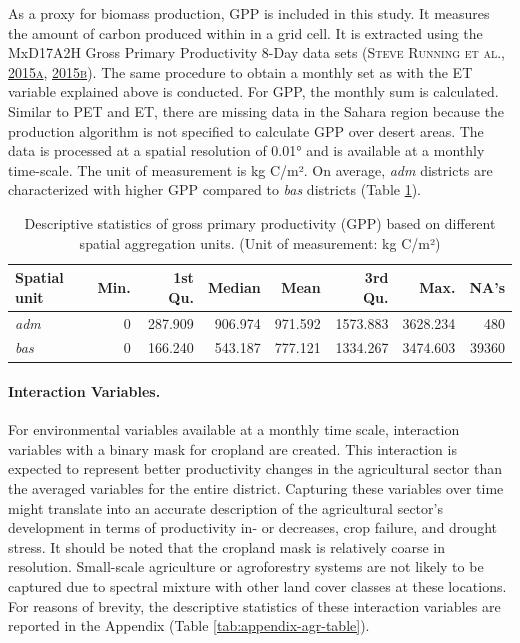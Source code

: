 \documentclass[a4paper,11pt]{article}
\begin{document}
As a proxy for biomass production, GPP is included in this study. It measures the amount
of carbon produced within in a grid cell. It is extracted using the MxD17A2H
Gross Primary Productivity 8-Day data sets \textsc{(\textnormal{\textsc{Steve Running} \textsc{et al.}}, \textnormal{\protect\hyperlink{ref-runningsteve2015}{2015}\protect\hyperlink{ref-runningsteve2015}{a}}, \protect\hyperlink{ref-runningsteve2015a}{2015}\protect\hyperlink{ref-runningsteve2015a}{b})}.
The same procedure to obtain a monthly set as with the ET variable explained
above is conducted. For GPP, the monthly sum is calculated. Similar
to PET and ET, there are missing data in the Sahara region because the production
algorithm is not specified to calculate GPP over desert areas. The data is
processed at a spatial resolution of 0.01° and is available at a monthly time-scale.
The unit of measurement is kg C/m². On average, \emph{adm} districts are characterized
with higher GPP compared to \emph{bas} districts (Table \ref{tab:02-data-gpp}).
\begin{table}[H]

\caption[Descriptive statistics of gross primary productivity (GPP).]{\label{tab:02-data-gpp}Descriptive statistics of gross primary productivity (GPP) based on different spatial
               aggregation units. (Unit of measurement: kg C/m²)}
\centering
\fontsize{10}{12}\selectfont
\begin{tabular}[t]{lrrrrrrr}
\toprule
Spatial unit & Min. & 1st Qu. & Median & Mean & 3rd Qu. & Max. & NA's\\
\midrule
\textit{adm} & 0 & 287.909 & 906.974 & 971.592 & 1573.883 & 3628.234 & 480\\
\textit{bas} & 0 & 166.240 & 543.187 & 777.121 & 1334.267 & 3474.603 & 39360\\
\bottomrule
\end{tabular}
\end{table}
\hypertarget{interaction-variables.}{%
\paragraph{Interaction Variables.}\label{interaction-variables.}}

For environmental variables available at a monthly time scale, interaction
variables with a binary mask for cropland are created. This interaction is
expected to represent better productivity changes in the agricultural sector
than the averaged variables for the entire district. Capturing these variables
over time might translate into an accurate description of the agricultural sector's
development in terms of productivity in- or decreases, crop failure, and
drought stress. It should be noted that the cropland mask is relatively coarse in
resolution. Small-scale agriculture or agroforestry systems are not likely
to be captured due to spectral mixture with other land cover classes at these
locations. For reasons of brevity, the descriptive statistics of these interaction
variables are reported in the Appendix (Table \ref{tab:appendix-agr-table}).
\end{document}
